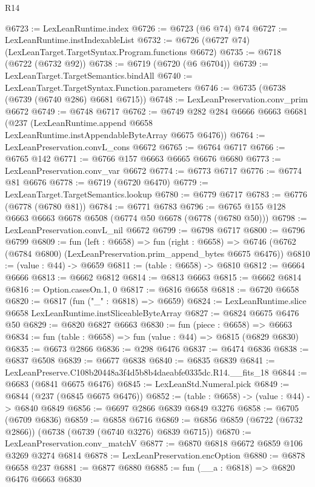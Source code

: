 \begin{lexlean}{R14}
\begin{coremodule}
@6723 := LexLeanRuntime.index
@6726 := @6723 (@6 @74) @74
@6727 := LexLeanRuntime.instIndexableList
@6732 := @6726 (@6727 @74) (LexLeanTarget.TargetSyntax.Program.functions @6672)
@6735 := @6718 (@6722 (@6732 @92))
@6738 := @6719 (@6720 (@6 @6704))
@6739 := LexLeanTarget.TargetSemantics.bindAll
@6740 := LexLeanTarget.TargetSyntax.Function.parameters
@6746 := @6735 (@6738 (@6739 (@6740 @286) @6681 @6715))
@6748 := LexLeanPreservation.conv_prim @6672
@6749 := @6748 @6717
@6762 := @6749
    @282
    @284
    @6666
    @6663
    @6681
    (@237 (LexLeanRuntime.append @6658 LexLeanRuntime.instAppendableByteArray @6675 @6476))
@6764 := LexLeanPreservation.convL_cons @6672
@6765 := @6764 @6717
@6766 := @6765 @142
@6771 := @6766 @157 @6663 @6665 @6676 @6680
@6773 := LexLeanPreservation.conv_var @6672
@6774 := @6773 @6717
@6776 := @6774 @81 @6676
@6778 := @6719 (@6720 @6470)
@6779 := LexLeanTarget.TargetSemantics.lookup
@6780 := @6779 @6717
@6783 := @6776 (@6778 (@6780 @81))
@6784 := @6771 @6783
@6796 := @6765 @155 @128 @6663 @6663 @6678 @6508 (@6774 @50 @6678 (@6778 (@6780 @50)))
@6798 := LexLeanPreservation.convL_nil @6672
@6799 := @6798 @6717
@6800 := @6796 @6799
@6809 := fun (left : @6658) =>
  fun (right : @6658) =>
  @6746 (@6762 (@6784 @6800) (LexLeanPreservation.prim_append_bytes @6675 @6476))
@6810 := (value : @44) -> @6659
@6811 := (table : @6658) -> @6810
@6812 := @6664 @6666
@6813 := @6662 @6812
@6814 := @6813 @6663
@6815 := @6662 @6814
@6816 := Option.casesOn.{1, 0}
@6817 := @6816 @6658
@6818 := @6720 @6658
@6820 := @6817 (fun ("_" : @6818) => @6659)
@6824 := LexLeanRuntime.slice @6658 LexLeanRuntime.instSliceableByteArray
@6827 := @6824 @6675 @6476 @50
@6829 := @6820 @6827 @6663
@6830 := fun (piece : @6658) => @6663
@6834 := fun (table : @6658) => fun (value : @44) => @6815 (@6829 @6830)
@6835 := @6673 @2866
@6836 := @298 @6476
@6837 := @6474 @6836
@6838 := @6837 @6508
@6839 := @6677 @6838
@6840 := @6835 @6839
@6841 := LexLeanPreserve.C108b20448a3f4d5b8b4daeabfe0335dc.R14.__fits_18
@6844 := @6683 (@6841 @6675 @6476)
@6845 := LexLeanStd.Numeral.pick
@6849 := @6844 (@237 (@6845 @6675 @6476))
@6852 := (table : @6658) -> (value : @44) -> @6840 @6849
@6856 := @6697 @2866 @6839 @6849 @3276
@6858 := @6705 (@6709 @6836)
@6859 := @6858 @6716
@6869 := @6856 @6859 (@6722 (@6732 @2866)) (@6738 (@6739 (@6740 @3276) @6839 @6715))
@6870 := LexLeanPreservation.conv_matchV
@6877 := @6870 @6818 @6672 @6859 @106 @3269 @3274 @6814
@6878 := LexLeanPreservation.encOption
@6880 := @6878 @6658 @237
@6881 := @6877 @6880
@6885 := fun (__a : @6818) => @6820 @6476 @6663 @6830

\end{coremodule}
\end{lexlean}
